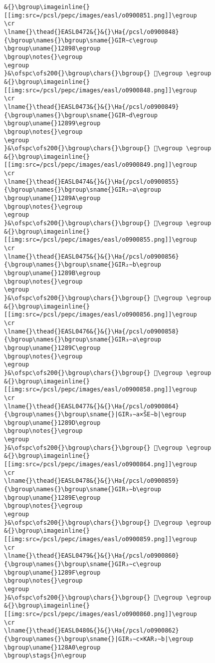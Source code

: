 \begin{verbatim}
&{}\bgroup\imageinline{}[[img:src=/pcsl/pepc/images/easl/o0900851.png]]\egroup
\cr
\lname{}\thead{}EASL0472&{}&{}\Ha{/pcsl/o0900848}{\bgroup\names{}\bgroup\sname{}GIR∼c\egroup
\bgroup\uname{}12898\egroup
\bgroup\notes{}\egroup
\egroup
}&\ofspc\ofs200{}\bgroup\chars{}\bgroup{} 𒢘\egroup \egroup
&{}\bgroup\imageinline{}[[img:src=/pcsl/pepc/images/easl/o0900848.png]]\egroup
\cr
\lname{}\thead{}EASL0473&{}&{}\Ha{/pcsl/o0900849}{\bgroup\names{}\bgroup\sname{}GIR∼d\egroup
\bgroup\uname{}12899\egroup
\bgroup\notes{}\egroup
\egroup
}&\ofspc\ofs200{}\bgroup\chars{}\bgroup{} 𒢙\egroup \egroup
&{}\bgroup\imageinline{}[[img:src=/pcsl/pepc/images/easl/o0900849.png]]\egroup
\cr
\lname{}\thead{}EASL0474&{}&{}\Ha{/pcsl/o0900855}{\bgroup\names{}\bgroup\sname{}GIR₂∼a\egroup
\bgroup\uname{}1289A\egroup
\bgroup\notes{}\egroup
\egroup
}&\ofspc\ofs200{}\bgroup\chars{}\bgroup{} 𒢚\egroup \egroup
&{}\bgroup\imageinline{}[[img:src=/pcsl/pepc/images/easl/o0900855.png]]\egroup
\cr
\lname{}\thead{}EASL0475&{}&{}\Ha{/pcsl/o0900856}{\bgroup\names{}\bgroup\sname{}GIR₂∼b\egroup
\bgroup\uname{}1289B\egroup
\bgroup\notes{}\egroup
\egroup
}&\ofspc\ofs200{}\bgroup\chars{}\bgroup{} 𒢛\egroup \egroup
&{}\bgroup\imageinline{}[[img:src=/pcsl/pepc/images/easl/o0900856.png]]\egroup
\cr
\lname{}\thead{}EASL0476&{}&{}\Ha{/pcsl/o0900858}{\bgroup\names{}\bgroup\sname{}GIR₃∼a\egroup
\bgroup\uname{}1289C\egroup
\bgroup\notes{}\egroup
\egroup
}&\ofspc\ofs200{}\bgroup\chars{}\bgroup{} 𒢜\egroup \egroup
&{}\bgroup\imageinline{}[[img:src=/pcsl/pepc/images/easl/o0900858.png]]\egroup
\cr
\lname{}\thead{}EASL0477&{}&{}\Ha{/pcsl/o0900864}{\bgroup\names{}\bgroup\sname{}|GIR₃∼a×ŠE∼b|\egroup
\bgroup\uname{}1289D\egroup
\bgroup\notes{}\egroup
\egroup
}&\ofspc\ofs200{}\bgroup\chars{}\bgroup{} 𒢝\egroup \egroup
&{}\bgroup\imageinline{}[[img:src=/pcsl/pepc/images/easl/o0900864.png]]\egroup
\cr
\lname{}\thead{}EASL0478&{}&{}\Ha{/pcsl/o0900859}{\bgroup\names{}\bgroup\sname{}GIR₃∼b\egroup
\bgroup\uname{}1289E\egroup
\bgroup\notes{}\egroup
\egroup
}&\ofspc\ofs200{}\bgroup\chars{}\bgroup{} 𒢞\egroup \egroup
&{}\bgroup\imageinline{}[[img:src=/pcsl/pepc/images/easl/o0900859.png]]\egroup
\cr
\lname{}\thead{}EASL0479&{}&{}\Ha{/pcsl/o0900860}{\bgroup\names{}\bgroup\sname{}GIR₃∼c\egroup
\bgroup\uname{}1289F\egroup
\bgroup\notes{}\egroup
\egroup
}&\ofspc\ofs200{}\bgroup\chars{}\bgroup{} 𒢟\egroup \egroup
&{}\bgroup\imageinline{}[[img:src=/pcsl/pepc/images/easl/o0900860.png]]\egroup
\cr
\lname{}\thead{}EASL0480&{}&{}\Ha{/pcsl/o0900862}{\bgroup\names{}\bgroup\sname{}|GIR₃∼c×KAR₂∼b|\egroup
\bgroup\uname{}128A0\egroup
\bgroup\stags{}n\egroup

\end{verbatim}
